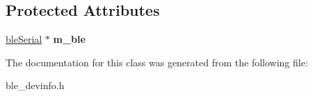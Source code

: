 \subsection*{Protected Attributes}
\begin{DoxyCompactItemize}
\item 
\hypertarget{classble_device_info_a12a144e14c48090240505c6be43c6eac}{\hyperlink{classble_serial}{ble\-Serial} $\ast$ {\bfseries m\-\_\-ble}}\label{classble_device_info_a12a144e14c48090240505c6be43c6eac}

\end{DoxyCompactItemize}


The documentation for this class was generated from the following file\-:\begin{DoxyCompactItemize}
\item 
ble\-\_\-devinfo.\-h\end{DoxyCompactItemize}
